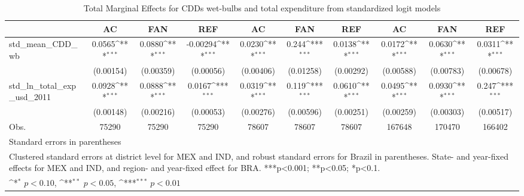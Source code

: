 \begin{table}[htbp]\centering\footnotesize{
\def\sym#1{\ifmmode^{#1}\else\(^{#1}\)\fi}
\caption{Total Marginal Effects for CDDs wet-bulbs and total expenditure from standardized logit models \label{table_1}}
\begin{tabular}{l*{9}{c}}
\hline\hline
            &\multicolumn{1}{c}{AC}&\multicolumn{1}{c}{FAN}&\multicolumn{1}{c}{REF}&\multicolumn{1}{c}{AC}&\multicolumn{1}{c}{FAN}&\multicolumn{1}{c}{REF}&\multicolumn{1}{c}{AC}&\multicolumn{1}{c}{FAN}&\multicolumn{1}{c}{REF}\\
\hline
std_mean_CDD_wb&      0.0565\sym{***}&      0.0880\sym{***}&    -0.00294\sym{***}&      0.0230\sym{***}&       0.244\sym{***}&      0.0138\sym{***}&      0.0172\sym{***}&      0.0630\sym{***}&      0.0311\sym{***}\\
            &   (0.00154)         &   (0.00359)         &   (0.00056)         &   (0.00406)         &   (0.01258)         &   (0.00292)         &   (0.00588)         &   (0.00783)         &   (0.00678)         \\
std_ln_total_exp_usd_2011&      0.0928\sym{***}&      0.0888\sym{***}&      0.0167\sym{***}&      0.0319\sym{***}&       0.119\sym{***}&      0.0610\sym{***}&      0.0495\sym{***}&      0.0930\sym{***}&       0.247\sym{***}\\
            &   (0.00148)         &   (0.00216)         &   (0.00053)         &   (0.00276)         &   (0.00596)         &   (0.00251)         &   (0.00259)         &   (0.00303)         &   (0.00517)         \\
\hline
Obs.        &       75290         &       75290         &       75290         &       78607         &       78607         &       78607         &      167648         &      170470         &      166402         \\
\hline\hline
\multicolumn{10}{l}{\footnotesize Standard errors in parentheses}\\
\multicolumn{10}{l}{\footnotesize Clustered standard errors at district level for MEX and IND, and robust standard errors for Brazil in parentheses. State- and year-fixed effects for MEX and IND, and region- and year-fixed effect for BRA. ***p<0.001; **p<0.05; *p<0.1.}\\
\multicolumn{10}{l}{\footnotesize \sym{*} \(p<0.10\), \sym{**} \(p<0.05\), \sym{***} \(p<0.01\)}\\
\end{tabular}}
\end{table}
